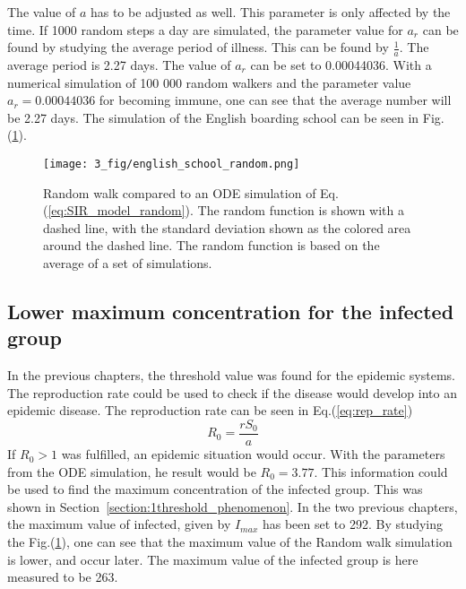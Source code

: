\documentclass[%
twoside,                 %
final,                   %
chapterprefix=true,      %
open=right               %
10pt]{book}
\begin{document}
\vspace{3mm}




\vspace{3mm}


The value of $a$ has to be adjusted as well. This parameter is only affected by the time. If 1000 random steps a day are simulated, the parameter value for $a_r$ can be found by studying the average period of illness. This can be found by $\frac{1}{a}$. The average period is 2.27 days. The value of $a_r$ can be set to 0.00044036. With a numerical simulation of 100 000 random walkers and the parameter value $a_r=0.00044036$ for becoming immune, one can see that the average number will be 2.27 days. The simulation of the English boarding school can be seen in Fig.(\ref{fig:english_school_random}).


\begin{figure}[ht]
  \centerline{\texttt{[image: 3\_fig/english\_school\_random.png]}}
  \caption{
  \label{fig:english_school_random}Random walk compared to an ODE simulation of Eq.(\ref{eq:SIR_model_random}). The random function is shown with a dashed line, with the standard deviation shown as the colored area around the dashed line. The random function is based on the average of a set of simulations.
  }
\end{figure}


\subsection{Lower maximum concentration for the infected group}
In the previous chapters, the threshold value was found for the epidemic systems. The reproduction rate could be used to check if the disease would develop into an epidemic disease. The reproduction rate can be seen in Eq.(\ref{eq:rep_rate})
\begin{equation} \label{eq:rep_rate}
R_0 = \frac{rS_0}{a}
\end{equation}
If $R_0> 1$ was fulfilled, an epidemic situation would occur. With the parameters from the ODE simulation, he result would be $R_0 = 3.77$. This information could be used to find the maximum concentration of the infected group. This was shown in Section~\ref{section:1threshold_phenomenon}. In the two previous chapters, the maximum value of infected, given by $I_{max}$ has been set to 292. By studying the Fig.(\ref{fig:english_school_random}), one can see that the maximum value of the Random walk simulation is lower, and occur later. The maximum value of the infected group is here measured to be 263. 
\end{document}
